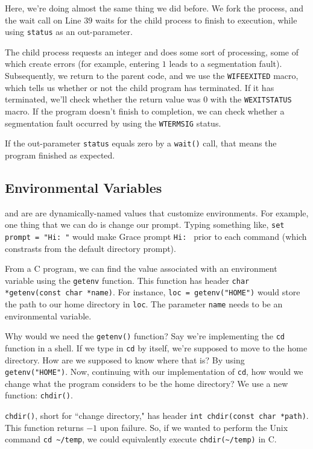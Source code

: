 Here, we're doing almost the same thing we did before. We fork the process, and the wait call on Line $39$ waits for the child process to finish to execution, while using \verb!status! as an out-parameter. 

The child process requests an integer and does some sort of processing, some of which create errors (for example, entering $1$ leads to a segmentation fault). Subsequently, we return to the parent code, and we use the \verb!WIFEEXITED! macro, which tells us whether or not the child program has terminated. If it has terminated, we'll check whether the return value was $0$ with the \verb!WEXITSTATUS! macro. If the program doesn't finish to completion, we can check whether a segmentation fault occurred by using the \verb!WTERMSIG! status. 

If the out-parameter \verb!status! equals zero by a \verb!wait()! call, that means the program finished as expected. 

\subsection{Environmental Variables}

 and  are are dynamically-named values that customize environments. For example, one thing that we can do is change our prompt. Typing something like, \verb!set prompt = "Hi: "! would make Grace prompt \verb!Hi: ! prior to each command (which constrasts from the default directory prompt).


From a C program, we can find the value associated with an environment variable using the \verb!getenv! function. This function has header \verb!char *getenv(const char *name)!. For instance, \verb!loc = getenv("HOME")! would store the path to our home directory in \verb!loc!. The parameter \verb!name! needs to be an environmental variable. 

Why would we need the \verb!getenv()! function? Say we're implementing the \verb!cd! function in a shell. If we type in \verb!cd! by itself, we're supposed to move to the home directory. How are we supposed to know where that is? By using \verb!getenv("HOME")!. Now, continuing with our implementation of \verb!cd!, how would we change what the program considers to be the home directory? We use a new function: \verb!chdir()!.


\verb!chdir()!, short for ``change directory," has header \verb!int chdir(const char *path)!. This function returns $-1$ upon failure. So, if we wanted to perform the Unix command \verb!cd ~/temp!, we could equivalently execute \verb!chdir(~/temp)! in C. 

